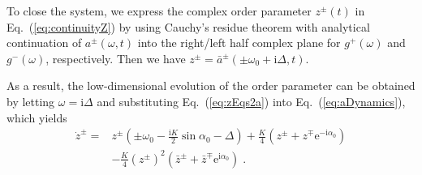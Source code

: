 \documentclass{article}
\begin{document}
To close the system, we express the complex order parameter $z^{\pm}\left( t \right)$ in Eq.~(\ref{eq:continuityZ}) by using Cauchy’s residue theorem with analytical continuation of $a^{\pm}\left( \omega ,t \right)$ into the right/left half complex plane for $g^{+}\left(\omega\right)$ and $g^{-}\left(\omega\right)$, respectively. Then we have $z^{\pm}=\bar{a}^{\pm}\left( \pm\omega _0+\mathrm{i}\Delta ,t \right) $.

As a result, the low-dimensional evolution of the order parameter can be obtained by letting $\omega =\mathrm{i}\Delta$ and substituting Eq.~(\ref{eq:zEqs2a}) into Eq.~(\ref{eq:aDynamics}), which yields
\begin{equation}
    \label{eq:zDynamics}
    \begin{aligned}
        \dot{z}^{\pm}=&z^{\pm}\left( \pm \omega _0-\frac{\mathrm{i}K}{2}\sin \alpha _0-\Delta \right)+\frac{K}{4}\left( z^{\pm}+z^{\mp}\mathrm{e}^{-\mathrm{i}\alpha _0} \right)\\
        &-\frac{K}{4}\left( z^{\pm} \right) ^2\left( \bar{z}^{\pm}+\bar{z}^{\mp}\mathrm{e}^{\mathrm{i}\alpha _0} \right) \;.\\
    \end{aligned}
\end{equation}
\end{document}
